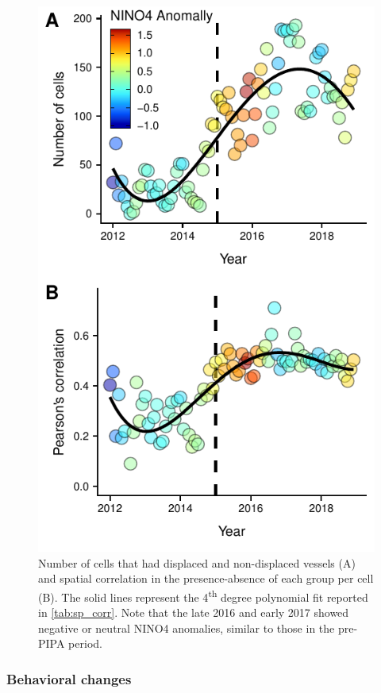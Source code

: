 \documentclass[9p,twocolumn,twoside,lineno]{pnas-new}
\begin{document}
\begin{figure}[ht]
\centering
\includegraphics{img/sp_corr.pdf}
\caption{\label{fig:sp_corr}Number of cells that had displaced and non-displaced vessels (A) and spatial correlation in the presence-absence of each group per cell (B). The solid lines represent the 4\textsuperscript{th} degree polynomial fit reported in \ref{tab:sp_corr}. Note that the late 2016 and early 2017 showed negative or neutral NINO4 anomalies, similar to those in the pre-PIPA period.}
\end{figure}

\subsubsection{Behavioral changes}
\end{document}
